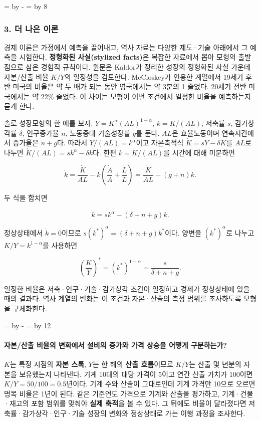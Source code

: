 \documentclass[10pt,a4paper]{article}
\newcommand{\ReserveQuestionSpace}{%
  \par\begingroup
  \dimen0=\pagegoal \advance\dimen0 by -\pagetotal
  \dimen2=\baselineskip \multiply\dimen2 by 12
  \ifdim\dimen0<\dimen2 \newpage\fi
  \endgroup}
\newcommand{\ReserveReadingSectionSpace}{%
  \par\begingroup
  \dimen0=\pagegoal \advance\dimen0 by -\pagetotal
  \dimen2=\baselineskip \multiply\dimen2 by 8
  \ifdim\dimen0<\dimen2 \newpage\fi
  \endgroup}
\begin{document}
\ReserveReadingSectionSpace
\subsubsection*{3. 더 나은 이론}

경제 이론은 가정에서 예측을 끌어내고, 역사 자료는 다양한 제도·기술 아래에서 그 예측을 시험한다. \textbf{정형화된 사실(stylized facts)}은 복잡한 자료에서 뽑아 모형의 출발점으로 삼은 경험적 규칙이다. 원문은 Kaldor가 정리한 성장의 정형화된 사실 가운데 자본/산출 비율 $K/Y$의 일정성을 검토한다. McCloskey가 인용한 계열에서 19세기 후반 미국의 비율은 약 두 배가 되는 동안 영국에서는 약 3분의 1 줄었다. 20세기 전반 미국에서는 약 22\% 줄었다. 이 차이는 모형이 어떤 조건에서 일정한 비율을 예측하는지 묻게 한다.\par

솔로 성장모형의 한 예를 보자. $Y=K^\alpha(AL)^{1-\alpha}$, $k=K/(AL)$, 저축률 $s$, 감가상각률 $\delta$, 인구증가율 $n$, 노동증대 기술성장률 $g$를 둔다. $AL$은 효율노동이며 연속시간에서 증가율은 $n+g$다. 따라서 $Y/(AL)=k^\alpha$이고 자본축적식 $\dot K=sY-\delta K$를 $AL$로 나누면 $\dot K/(AL)=sk^\alpha-\delta k$다. 한편 $k=K/(AL)$를 시간에 대해 미분하면\par

\[
\dot k=\frac{\dot K}{AL}-k\left(\frac{\dot A}{A}+\frac{\dot L}{L}\right)=\frac{\dot K}{AL}-(g+n)k.
\]

두 식을 합치면\par

\[
\dot k=s k^\alpha-(\delta+n+g)k.
\]

정상상태에서 $\dot k=0$이므로 $s(k^*)^\alpha=(\delta+n+g)k^*$이다. 양변을 $(k^*)^\alpha$로 나누고 $K/Y=k^{1-\alpha}$를 사용하면\par

\[
\left(\frac{K}{Y}\right)^*=(k^*)^{1-\alpha}=\frac{s}{\delta+n+g}.
\]

일정한 비율은 저축·인구·기술·감가상각 조건이 일정하고 경제가 정상상태에 있을 때의 결과다. 역사 계열의 변화는 이 조건과 자본·산출의 측정 범위를 조사하도록 모형을 구체화한다.\par

\ReserveQuestionSpace
\paragraph{자본/산출 비율의 변화에서 설비의 증가와 가격 상승을 어떻게 구분하는가?}
$K$는 특정 시점의 \textbf{자본 스톡}, $Y$는 한 해의 \textbf{산출 흐름}이므로 $K/Y$는 산출 몇 년분의 자본을 보유했는지 나타낸다. 기계 10대의 대당 가격이 5이고 연간 산출 가치가 100이면 $K/Y=50/100=0.5$년이다. 기계 수와 산출이 그대로인데 기계 가격만 10으로 오르면 명목 비율은 1년이 된다. 같은 기준연도 가격으로 기계와 산출을 평가하고, 기계·건물·재고의 포함 범위를 맞춰야 \textbf{실제 축적}을 볼 수 있다. 그 뒤에도 비율이 달라졌다면 저축률·감가상각·인구·기술 성장의 변화와 정상상태로 가는 이행 과정을 조사한다.\par
\end{document}
